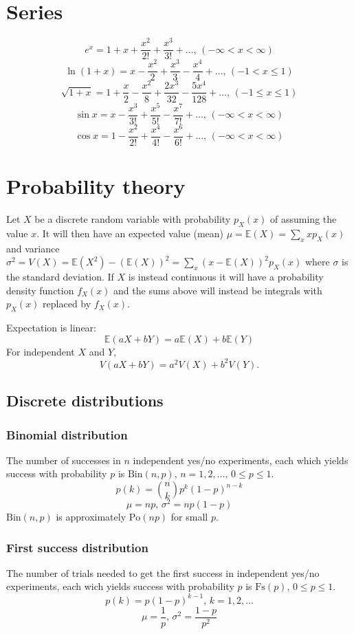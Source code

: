 		\section{Series} 
		$$e^x = 1+x+\frac{x^2}{2!}+\frac{x^3}{3!}+\dots,\,(-\infty<x<\infty)$$
		$$\ln(1+x) = x-\frac{x^2}{2}+\frac{x^3}{3}-\frac{x^4}{4}+\dots,\,(-1<x\leq1)$$
		$$\sqrt{1+x} = 1+\frac{x}{2}-\frac{x^2}{8}+\frac{2x^3}{32}-\frac{5x^4}{128}+\dots,\,(-1\leq x\leq1)$$
		$$\sin x = x-\frac{x^3}{3!}+\frac{x^5}{5!}-\frac{x^7}{7!}+\dots,\,(-\infty<x<\infty)$$
		$$\cos x = 1-\frac{x^2}{2!}+\frac{x^4}{4!}-\frac{x^6}{6!}+\dots,\,(-\infty<x<\infty)$$
														
		\section{Probability theory}
		Let $X$ be a discrete random variable with probability $p_X(x)$ of assuming the value $x$. It will then have an expected value (mean) $\mu=\mathbb{E}(X)=\sum_xxp_X(x)$ and variance $\sigma^2=V(X)=\mathbb{E}(X^2)-(\mathbb{E}(X))^2=\sum_x(x-\mathbb{E}(X))^2p_X(x)$ where $\sigma$ is the standard deviation. If $X$ is instead continuous it will have a probability density function $f_X(x)$ and the sums above will instead be integrals with $p_X(x)$ replaced by $f_X(x)$.
														
		Expectation is linear:
		\[\mathbb{E}(aX+bY) = a\mathbb{E}(X)+b\mathbb{E}(Y)\]
		For independent $X$ and $Y$, \[V(aX+bY) = a^2V(X)+b^2V(Y).\]
														
		\subsection{Discrete distributions}
														
		\subsubsection{Binomial distribution}
		The number of successes in $n$ independent yes/no experiments, each which yields success with probability $p$ is $\textrm{Bin}(n,p),\,n=1,2,\dots,\, 0\leq p\leq1$.
		\[p(k)=\binom{n}{k}p^k(1-p)^{n-k}\]
		\[\mu = np,\,\sigma^2=np(1-p)\]
		$\textrm{Bin}(n,p)$ is approximately $\textrm{Po}(np)$ for small $p$.
														
		\subsubsection{First success distribution}
		The number of trials needed to get the first success in independent yes/no experiments, each wich yields success with probability $p$ is $\textrm{Fs}(p),\,0\leq p\leq1$.
		\[p(k)=p(1-p)^{k-1},\,k=1,2,\dots\]
		\[\mu = \frac1p,\,\sigma^2=\frac{1-p}{p^2}\]
														
